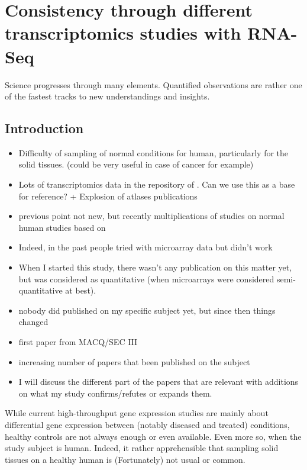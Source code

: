 \chapter{Consistency through different transcriptomics studies with RNA-Seq}
\label{ch:Transcriptomics}



Science progresses through many elements. Quantified observations are rather one
of the fastest tracks to new understandings and insights.

\section{Introduction}

\begin{itemize}
    \item Difficulty of sampling of normal conditions for human, particularly
        for the solid tissues. (could be very useful in case of cancer for
        example)
    \item Lots of transcriptomics data in the repository of \EBI{}. Can we use
        this as a base for reference? + Explosion of atlases publications
    \item previous point not new, but recently multiplications of studies on
        normal human studies based on \Rnaseq
    \item Indeed, in the past people tried with microarray data but didn't work
    \item When I started this study, there wasn't any publication on this matter
        yet, but \Rnaseq was considered as quantitative (when microarrays were
        considered semi-quantitative at best).
    \item nobody did published on my specific subject yet, but since then things changed
    \item first paper from MACQ/SEC III
    \item increasing number of papers that been published on the subject
    \item I will discuss the different part of the papers that are relevant
        with additions on what my study confirms/refutes or expands them.
\end{itemize}


While current high-throughput gene expression studies are mainly about
differential gene expression between (notably diseased and treated) conditions,
healthy controls are not always enough or even available. Even more so, when the
study subject is human. Indeed, it rather apprehensible that sampling solid
tissues on a healthy human is (Fortunately) not usual or common.

